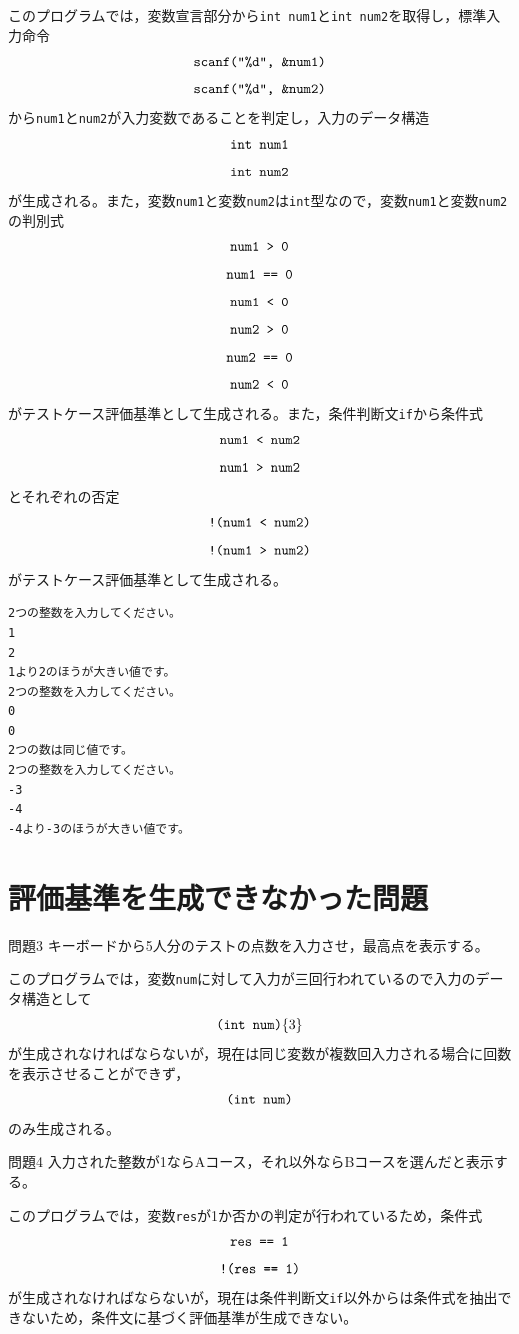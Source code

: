 \documentclass{tpu-sotu}
\begin{document}

このプログラムでは，変数宣言部分から{\tt int num1}と{\tt int num2}を取得し，標準入力命令\\
\[ 
\mbox{{\tt {scanf("\%d", \&num1)}}}
\]
\[ 
\mbox{{\tt {scanf("\%d", \&num2)}}}
\]
から{\tt num1}と{\tt num2}が入力変数であることを判定し，入力のデータ構造\\
\[
\mbox{{\tt int num1}}
\]
\[
\mbox{{\tt int num2}}
\]
が生成される。また，変数{\tt num1}と変数{\tt num2}は{\tt int}型なので，変数{\tt num1}と変数{\tt num2}の判別式\\
\[ 
\mbox{\tt{num1 > 0}} 
\]
\[
\mbox{\tt{num1 == 0}}
\]
\[
\mbox{\tt{num1 < 0}}
\]
\[ 
\mbox{\tt{num2 > 0}} 
\]
\[
\mbox{\tt{num2 == 0}}
\]
\[
\mbox{\tt{num2 < 0}}
\]
がテストケース評価基準として生成される。また，条件判断文{\tt if}から条件式\\
\[
\mbox{\tt{num1 < num2}}
\]
\[
\mbox{\tt{num1 > num2}}
\]
とそれぞれの否定\\
\[
\mbox{\tt{!(num1 < num2)}}
\]
\[
\mbox{\tt{!(num1 > num2)}}
\]
がテストケース評価基準として生成される。

\begin{lstlisting}[xleftmargin=1cm]
2つの整数を入力してください。
1
2
1より2のほうが大きい値です。
2つの整数を入力してください。
0
0
2つの数は同じ値です。
2つの整数を入力してください。
-3
-4
-4より-3のほうが大きい値です。

\end{lstlisting}

\section{評価基準を生成できなかった問題}
\begin{itembox}[l]{問題3}
キーボードから5人分のテストの点数を入力させ，最高点を表示する。
\end{itembox}

このプログラムでは，変数{\tt num}に対して入力が三回行われているので入力のデータ構造として
\[
\mbox{{\tt (int num)}\{3\}}
\]
が生成されなければならないが，現在は同じ変数が複数回入力される場合に回数を表示させることができず，
\[
\mbox{{\tt (int num)}}
\]
のみ生成される。
\begin{itembox}[l]{問題4}
入力された整数が1ならAコース，それ以外ならBコースを選んだと表示する。
\end{itembox}

このプログラムでは，変数{\tt res}が1か否かの判定が行われているため，条件式
\[
\mbox{\tt{res == 1}}
\]
\[
\mbox{\tt{!(res == 1)}}
\]
が生成されなければならないが，現在は条件判断文{\tt if}以外からは条件式を抽出できないため，条件文に基づく評価基準が生成できない。
\end{document}
